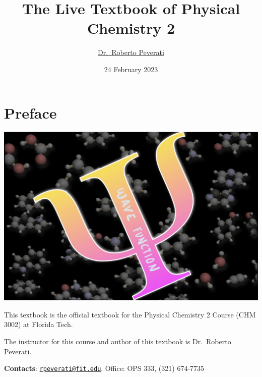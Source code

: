 \documentclass[
  9pt,
]{extbook}
\title{The Live Textbook of Physical Chemistry 2}
\author{\href{mailto:rpeverati@fit.edu}{Dr.~Roberto Peverati}}
\date{24 February 2023}
\let\oldmaketitle\maketitle
\theoremstyle{definition}
\theoremstyle{definition}
\theoremstyle{definition}
\theoremstyle{remark}
\begin{document}
\maketitle


%
\newpage

\let\maketitle\oldmaketitle

\renewcommand\thepage{\romannumeral\numexpr\value{page}-1\relax}


{
\setcounter{tocdepth}{1}
\tableofcontents
}
\renewcommand{\arraystretch}{1.8}

\hypertarget{preface}{%
\chapter*{Preface}\label{preface}}

\begin{center}\includegraphics[width=0.8\linewidth]{./img/OEP_Figures.000} \end{center}

This textbook is the official textbook for the Physical Chemistry 2 Course (CHM 3002) at Florida Tech.

The instructor for this course and author of this textbook is Dr.~Roberto Peverati.

\textbf{Contacts}: \href{mailto:rpeverati@fit.edu}{\nolinkurl{rpeverati@fit.edu}}, Office: OPS 333, (321) 674-7735
\end{document}
